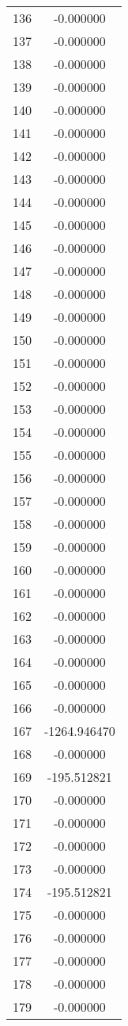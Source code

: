 \documentclass[12pt]{article}
\begin{document}
\begin{longtable}{@{}cc@{}}
136 & -0.000000 \\
137 & -0.000000 \\
138 & -0.000000 \\
139 & -0.000000 \\
140 & -0.000000 \\
141 & -0.000000 \\
142 & -0.000000 \\
143 & -0.000000 \\
144 & -0.000000 \\
145 & -0.000000 \\
146 & -0.000000 \\
147 & -0.000000 \\
148 & -0.000000 \\
149 & -0.000000 \\
150 & -0.000000 \\
151 & -0.000000 \\
152 & -0.000000 \\
153 & -0.000000 \\
154 & -0.000000 \\
155 & -0.000000 \\
156 & -0.000000 \\
157 & -0.000000 \\
158 & -0.000000 \\
159 & -0.000000 \\
160 & -0.000000 \\
161 & -0.000000 \\
162 & -0.000000 \\
163 & -0.000000 \\
164 & -0.000000 \\
165 & -0.000000 \\
166 & -0.000000 \\
167 & -1264.946470 \\
168 & -0.000000 \\
169 & -195.512821 \\
170 & -0.000000 \\
171 & -0.000000 \\
172 & -0.000000 \\
173 & -0.000000 \\
174 & -195.512821 \\
175 & -0.000000 \\
176 & -0.000000 \\
177 & -0.000000 \\
178 & -0.000000 \\
179 & -0.000000 \\

\end{longtable}
\end{document}
